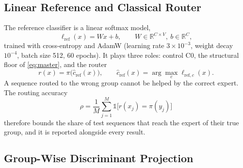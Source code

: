 \documentclass[conference]{IEEEtran}
\begin{document}
\subsection{Linear Reference and Classical Router}
\label{sec:router}

The reference classifier is a linear softmax model,
\begin{equation}
    \ell_{\mathrm{ref}}(x)=Wx+b,\qquad W\in\mathbb{R}^{C\times V},\ b\in\mathbb{R}^{C},
    \label{eq:reference}
\end{equation}
trained with cross-entropy and AdamW (learning rate $3\times10^{-3}$, weight decay $10^{-4}$, batch size 512, 60 epochs). It plays three roles: control C0, the structural floor of \eqref{eq:master}, and the router
\begin{equation}
    r(x)=\pi\big(\hat{c}_{\mathrm{ref}}(x)\big),\qquad \hat{c}_{\mathrm{ref}}(x)=\arg\max_{c}\ell_{\mathrm{ref},c}(x).
    \label{eq:router}
\end{equation}
A sequence routed to the wrong group cannot be helped by the correct expert. The routing accuracy
\begin{equation}
    \rho=\frac{1}{M}\sum_{j=1}^{M}\mathbb{1}\big[r(x_j)=\pi(y_j)\big]
    \label{eq:routing-accuracy}
\end{equation}
therefore bounds the share of test sequences that reach the expert of their true group, and it is reported alongside every result.

\subsection{Group-Wise Discriminant Projection}
\label{sec:projection}
\end{document}

